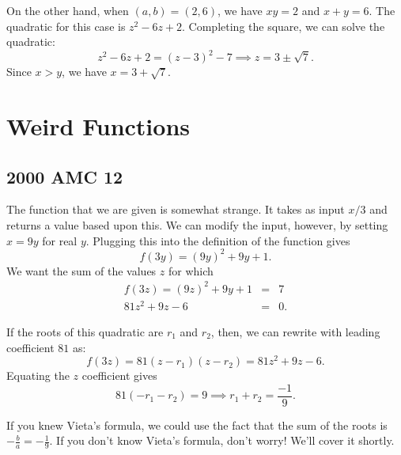 On the other hand, when $(a,b)=(2,6)$, we have $xy=2$ and $x+y=6$. The quadratic for this case is $z^2-6z+2$. Completing the square, we can solve the quadratic: $$z^2-6z+2=(z-3)^2-7\implies z=3\pm \sqrt{7}.$$ Since $x>y$, we have $x=\boxed{3+\sqrt{7}}$.  



\section{Weird Functions}


\subsection{2000 AMC 12}
The function that we are given is somewhat strange. It takes as input $x/3$ and returns a value based upon this. We can modify the input, however, by setting \color{blue} $x=9y$ \color{black} for real $y$. Plugging this into the definition of the function gives $$f(3y)=(9y)^2+9y+1.$$ We want the sum of the values $z$ for which \begin{eqnarray*} f(3z)=(9z)^2+9y+1&=&7 \\ 81z^2+9z-6 &=& 0. \end{eqnarray*}

If the roots of this quadratic are $r_1$ and $r_2$, then, we can rewrite with leading coefficient $81$ as: $$f(3z)=81(z-r_1)(z-r_2)=81z^2+9z-6.$$ Equating the $z$ coefficient gives $$81(-r_1-r_2)=9\implies r_1+r_2=\boxed{\frac{-1}{9}}.$$ 

If you knew Vieta's formula, we could use the fact that the sum of the roots is $\displaystyle -\frac{b}{a}=-\frac{1}{9}$. If you don't know Vieta's formula, don't worry! We'll cover it shortly.  

